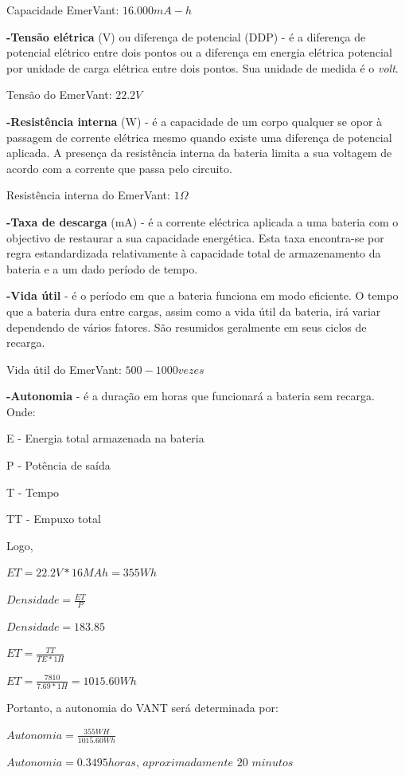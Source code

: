 	Capacidade EmerVant: $16.000mA-h$

\textbf{-Tensão elétrica} (V) ou diferença de potencial (DDP) - é a diferença de potencial elétrico entre dois pontos ou a diferença em energia elétrica potencial por unidade de carga elétrica entre dois pontos. Sua unidade de medida é o \textit{volt}.
	
	Tensão do EmerVant: $22.2 V$

\textbf{-Resistência interna} (W) - é a capacidade de um corpo qualquer se opor à passagem de corrente elétrica mesmo quando existe uma diferença de potencial aplicada. A presença da resistência interna da bateria limita a sua voltagem de acordo com a corrente que passa pelo circuito.

	Resistência interna do EmerVant: $1\Omega$

\textbf{-Taxa de descarga} (mA) - é a corrente eléctrica aplicada a uma bateria com o objectivo de restaurar a sua capacidade energética. Esta taxa encontra-se por regra estandardizada relativamente à capacidade total de armazenamento da bateria e a um dado período de tempo.

\textbf{-Vida útil} - é o período em que a bateria funciona em modo eficiente. O tempo que a bateria dura entre cargas, assim como a vida útil da bateria, irá variar dependendo de vários fatores. São resumidos geralmente em seus ciclos de recarga.
	
	Vida útil do EmerVant: $500-1000 vezes$

\textbf{-Autonomia} - é a duração em horas que funcionará a bateria sem recarga. Onde:

E - Energia total armazenada na bateria

P - Potência de saída

T - Tempo

TT - Empuxo total

Logo,

$ET= 22.2 V * 16MAh= 355Wh$

$Densidade = \frac{ET}{P}$

$Densidade = 183.85$

$ET= \frac{TT}{TE*1H}$

$ET = \frac{7810}{7.69*1H} = 1015.60 Wh$

Portanto, a autonomia do VANT será determinada por:

$Autonomia = \frac{355WH}{1015.60Wh}$

$Autonomia = 0.3495 horas$, $aproximadamente$ $20$ $minutos$
